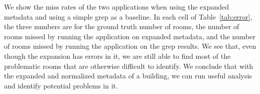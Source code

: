 We show the miss rates of the two applications when using the expanded metadata and using a simple grep as a baseline. In each cell of Table~\ref{tab:error}, the three numbers are for the ground truth number of rooms, the number of rooms missed by running the application on expanded metadata, and the number of rooms missed by running the application on the grep results. We see that, even though the expansion has errors in it, we are still able to find most of the problematic rooms that are otherwise difficult to identify. We conclude that with the expanded and normalized metadata of a building, we can run useful analysis and identify potential problems in it.
